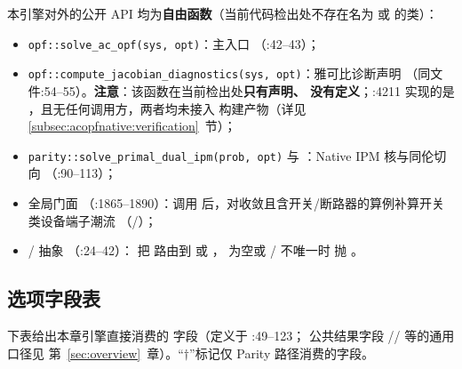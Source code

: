 本引擎对外的公开 API 均为\textbf{自由函数}（当前代码检出处不存在名为
 或  的类）：
\begin{itemize}
  \item \texttt{opf::solve\_ac\_opf(sys, opt)}：主入口
        （:42--43）；
  \item \texttt{opf::compute\_jacobian\_diagnostics(sys, opt)}：雅可比诊断声明
        （同文件:54--55）。\textbf{注意}：该函数在当前检出处\textbf{只有声明、
        没有定义}；:4211 实现的是
        ，且无任何调用方，两者均未接入
        构建产物（详见 \ref{subsec:acopfnative:verification}~节）；
  \item \texttt{parity::solve\_primal\_dual\_ipm(prob, opt)} 与
        ：Native IPM 核与同伦切向
        （:90--113）；
  \item {} 全局门面
        （:1865--1890）：调用 
        后，对收敛且含开关/断路器的算例补算开关类设备端子潮流
        （/）；
  \item {}/ 抽象
        （:24--42）：
        把  路由到  或
        ， 为空或 / 不唯一时
        抛 。
\end{itemize}

\subsection{选项字段表}\label{subsec:acopfnative:options}

下表给出本章引擎直接消费的  字段（定义于
:49--123；
公共结果字段 // 等的通用口径见
第~\ref{sec:overview}~章）。``$\dagger$''标记仅 Parity 路径消费的字段。

